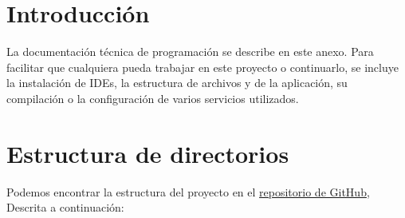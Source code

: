 
\section{Introducción}

La documentación técnica de programación se describe en este anexo. Para facilitar que cualquiera pueda trabajar en este proyecto o continuarlo, se incluye la instalación de IDEs, la estructura de archivos y de la aplicación, su compilación o la configuración de varios servicios utilizados.

\section{Estructura de directorios}

Podemos encontrar la estructura del proyecto en el \href{https://github.com/fmv1001/F1RacePredictor}{repositorio de GitHub}, Descrita a continuación:

